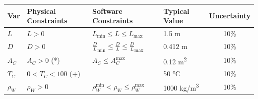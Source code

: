 \documentclass[12pt]{article}
\begin{document}
\begin{table}[!h]
  \caption{Input Variables} \label{TblInputVar}
  \renewcommand{\arraystretch}{1.2}
\noindent \begin{longtable*}{l l l l c} 
  \toprule
  \textbf{Var} & \textbf{Physical Constraints} & \textbf{Software Constraints} &
                             \textbf{Typical Value} & \textbf{Uncertainty}\\
  \midrule 
  $L$ & $L > 0$ & $L_{\text{min}} \leq L \leq L_{\text{max}}$ & 1.5 \si[per-mode=symbol] {\metre} & 10\%
  \\
  $D$ & $D > 0$ & ${\frac{D}{L}}_\text{min} \leq \frac{D}{L} \leq {\frac{D}{L}}_\text{max}$ 
	& 0.412 \si[per-mode=symbol] {\metre} & 10\%
  \\
  $A_C$ & $A_C > 0$ (*) & $A_C \leq A_C^{\text{max}}$ & 0.12 \si[per-mode=symbol] {\square\metre} & 10\%
  \\
  $T_C$ & $0 < T_C < 100$ (+)	& & 50 \si[per-mode=symbol] {\celsius} & 10\%
  \\
  $\rho_W$ & $\rho_W > 0$ & $\rho_W^{\text{min}} < \rho_W \leq \rho_W^{\text{max}}$ 
	& 1000 \si[per-mode=symbol] {\kilo\gram\per\cubic\metre} & 10\%

\end{longtable*}
\end{table}
\end{document}
